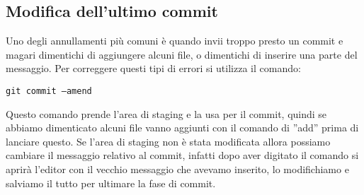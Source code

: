 \subsection{Modifica dell'ultimo commit}
Uno degli annullamenti più comuni è quando invii troppo presto un commit e magari dimentichi di aggiungere alcuni file, o dimentichi di inserire una parte del messaggio. Per correggere questi tipi di errori si utilizza il comando:

\begin{center}
\texttt{git commit --amend}
\end{center}

Questo comando prende l'area di staging e la usa per il commit, quindi se abbiamo dimenticato alcuni file vanno aggiunti con il comando di ''add'' prima di lanciare questo. Se l'area di staging non è stata modificata allora possiamo cambiare il messaggio relativo al commit, infatti dopo aver digitato il comando si aprirà l'editor con il vecchio messaggio che avevamo inserito, lo modifichiamo e salviamo il tutto per ultimare la fase di commit.
